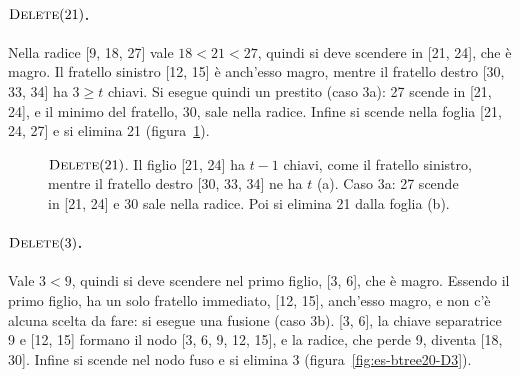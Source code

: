 \paragraph{$\textsc{Delete}(21)$.}
Nella radice [9, 18, 27] vale $18 < 21 < 27$, quindi si deve scendere in [21, 24], che è magro. Il fratello sinistro [12, 15] è anch'esso magro, mentre il fratello destro [30, 33, 34] ha $3 \ge t$ chiavi. Si esegue quindi un prestito (caso 3a): 27 scende in [21, 24], e il minimo del fratello, 30, sale nella radice. Infine si scende nella foglia [21, 24, 27] e si elimina 21 (figura~\ref{fig:es-btree20-D21}).

\begin{figure}[htbp]
\centering
{}
\caption{$\textsc{Delete}(21)$. Il figlio [21, 24] ha $t-1$ chiavi, come il fratello sinistro, mentre il fratello destro [30, 33, 34] ne ha $t$ (a). Caso 3a: 27 scende in [21, 24] e 30 sale nella radice. Poi si elimina 21 dalla foglia (b).}
\label{fig:es-btree20-D21}
\end{figure}

\paragraph{$\textsc{Delete}(3)$.}
Vale $3 < 9$, quindi si deve scendere nel primo figlio, [3, 6], che è magro. Essendo il primo figlio, ha un solo fratello immediato, [12, 15], anch'esso magro, e non c'è alcuna scelta da fare: si esegue una fusione (caso 3b). [3, 6], la chiave separatrice 9 e [12, 15] formano il nodo [3, 6, 9, 12, 15], e la radice, che perde 9, diventa [18, 30]. Infine si scende nel nodo fuso e si elimina 3 (figura~\ref{fig:es-btree20-D3}).

